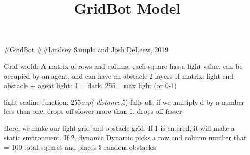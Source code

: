 \documentclass[]{article}
\title{GridBot Model}
\author{}
\date{}
\begin{document}
\maketitle

\#GridBot \#\#Lindsey Sample and Josh DeLeew, 2019

Grid world: A matrix of rows and colums, each square has a light value,
can be occupied by an agent, and can have an obstacle 2 layers of
matrix: light and obstacle + agent light: 0 = dark, 255= max light (or
0-1)

light scaline function: 255\emph{exp(-distance}.5) falls off, if we
multiply d by a number less than one, drops off slower more than 1,
drops off faster

Here, we make our light grid and obstacle grid. If 1 is entered, it will
make a static environment. If 2, dynamic Dynamic picks a row and column
number that = 100 total squares and places 5 random obstacles
\end{document}
